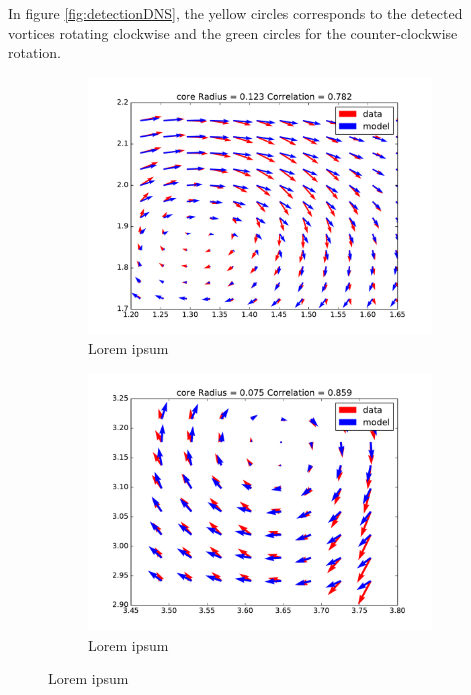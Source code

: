 \documentclass[12pt, a4paper, openany]{memoir}
\begin{document}
In figure \ref{fig:detectionDNS}, the yellow circles corresponds to the detected vortices rotating clockwise and the green circles for the counter-clockwise rotation.

\begin{figure}[h!]
	\centering
	\begin{subfigure}[b]{0.4\textwidth}
		\centering
		\includegraphics[width=\textwidth]{figure/dns_fit1.pdf}
		\caption{Lorem ipsum}
	\end{subfigure}
	\begin{subfigure}[b]{0.4\textwidth}
		\centering
		\includegraphics[width=\textwidth]{figure/dns_fit2.pdf}
		\caption{Lorem ipsum}
	\end{subfigure}

\end{figure}
\end{document}
